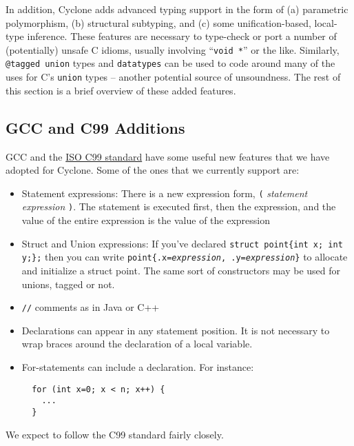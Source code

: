In addition, Cyclone adds advanced typing support in the form of (a)
parametric polymorphism, (b) structural subtyping, and (c) some
unification-based, local-type inference.  These features are necessary
to type-check or port a number of (potentially) unsafe C idioms,
usually involving ``\texttt{void *}'' or the like.  Similarly,
\texttt{@tagged union} types and \texttt{datatypes} 
can be used to code around many of the uses
for C's \texttt{union} types -- another potential source of
unsoundness.  The rest of this section is a brief overview of these
added features.

\subsection{GCC and C99 Additions}

GCC and the
\href{http://web.onetelnet.ch/~twolf/tw/c/c9x_changes.html}{ISO C99
  standard} have some useful new features that we have adopted for
Cyclone. Some of the ones that we currently support are:
\begin{itemize}
\item Statement expressions: There is a new expression form,
  \texttt{(\lb} \textit{statement} \textit{expression} \texttt{\rb)}.
  The statement is executed first, then the expression, and the value
  of the entire expression is the value of the expression
\item Struct and Union expressions:  If you've declared
  \texttt{struct point\{int x; int y;\};} then you can write
  \texttt{point\{.x=\textit{expression}, .y=\textit{expression}\}}
 to allocate and initialize a struct point.  The same sort of
 constructors may be used for unions, tagged or not.
\item \texttt{//} comments as in Java or C++
\item Declarations can appear in any statement position.  It is not
  necessary to wrap braces around the declaration of a local variable.
\item For-statements can include a declaration. For instance:
\begin{verbatim}
  for (int x=0; x < n; x++) { 
    ...
  }
\end{verbatim}
\end{itemize}

We expect to follow the C99 standard fairly closely.

